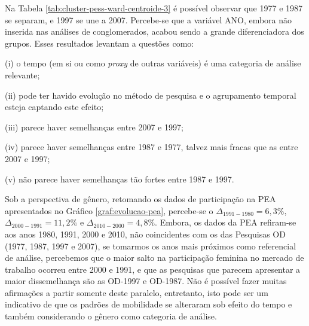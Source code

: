 \newpage
Na Tabela \ref{tab:cluster-pess-ward-centroide-3} é possível observar que 1977 e 1987 se separam, e 1997 se une a 2007. 
Percebe-se que a variável ANO, embora não inserida nas análises de conglomerados, acabou sendo a grande diferenciadora dos grupos.
Esses resultados levantam a questões como:
\begin{compactitem}[]
\item (i) o tempo (em si ou como \textit{proxy} de outras variáveis) é uma categoria de análise relevante;
\item (ii) pode ter havido evolução no método de pesquisa e o agrupamento temporal esteja captando este efeito; 
\item (iii) parece haver semelhanças entre 2007 e 1997;
\item (iv) parece haver semelhanças entre 1987 e 1977, talvez mais fracas que as entre 2007 e 1997;
\item (v) não parece haver semelhanças tão fortes entre 1987 e 1997.
\end{compactitem}
    
\begin{table}[htb]
\end{table}

Sob a perspectiva de gênero, retomando os dados de participação na PEA apresentados no Gráfico \ref{graf:evolucao-pea}, 
percebe-se o $\Delta_{1991-1980} = 6,3\%$, $\Delta_{2000-1991} = 11,2\%$ e $\Delta_{2010-2000} = 4,8\%$. Embora, os dados da PEA refiram-se aos anos 1980, 1991, 2000 e 2010, não coincidentes com os das Pesquisas OD (1977, 1987, 1997 e 2007), se tomarmos os anos mais próximos como referencial de análise, percebemos que o maior salto na participação feminina no mercado de trabalho ocorreu entre 2000 e 1991, e que as pesquisas que parecem apresentar a maior dissemelhança são as OD-1997 e OD-1987. Não é possível fazer muitas afirmações a partir somente deste paralelo, entretanto, isto pode ser um indicativo de que os padrões de mobilidade se alteraram sob efeito do tempo e também considerando o gênero como categoria de análise.
 
